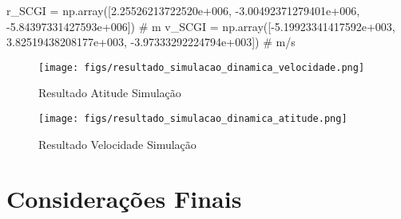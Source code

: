 r_SCGI = np.array([2.25526213722520e+006, -3.00492371279401e+006, -5.84397331427593e+006]) # m
v_SCGI = np.array([-5.19923341417592e+003, 3.82519438208177e+003, -3.97333292224794e+003]) # m/s


\begin{figure}[htpb]
	\centering
	\texttt{[image: figs/resultado\_simulacao\_dinamica\_velocidade.png]}
	\caption{Resultado Atitude Simulação}
	\label{fig:15}
\end{figure}

\begin{figure}[htpb]
	\centering
	\texttt{[image: figs/resultado\_simulacao\_dinamica\_atitude.png]}
	\caption{Resultado Velocidade Simulação}
	\label{fig:15}
\end{figure}

\section{Considerações Finais}




